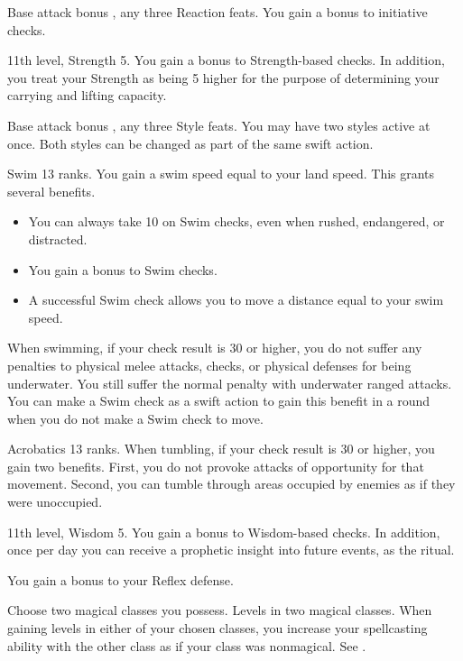 \featpre Base attack bonus , any three Reaction feats.
\featben You gain a  bonus to initiative checks.

\featpre 11th level, Strength 5.
\featben You gain a  bonus to Strength-based checks. In addition, you treat your Strength as being 5 higher for the purpose of determining your carrying and lifting capacity.

\featpre Base attack bonus , any three Style feats.
\featben You may have two styles active at once. Both styles can be changed as part of the same swift action.

\featpre Swim 13 ranks.
\featben You gain a swim speed equal to your land speed. This grants several benefits.
\begin{itemize}
  \item You can always take 10 on Swim checks, even when rushed, endangered, or distracted.
  \item You gain a  bonus to Swim checks.
  \item A successful Swim check allows you to move a distance equal to your swim speed.
\end{itemize}

When swimming, if your check result is 30 or higher, you do not suffer any penalties to physical melee attacks, checks, or physical defenses for being underwater. You still suffer the normal penalty with underwater ranged attacks. You can make a Swim check as a swift action to gain this benefit in a round when you do not make a Swim check to move.

\featpre Acrobatics 13 ranks.
\featben When tumbling, if your check result is 30 or higher, you gain two benefits. First, you do not provoke attacks of opportunity for that movement. Second, you can tumble through areas occupied by enemies as if they were unoccupied.

\featpre 11th level, Wisdom 5.
\featben You gain a  bonus to Wisdom-based checks. In addition, once per day you can receive a prophetic insight into future events, as the  ritual.

 You gain a  bonus to your Reflex defense.

Choose two magical classes you possess.
 Levels in two magical classes.
 When gaining levels in either of your chosen classes, you increase your spellcasting ability with the other class as if your class was nonmagical. See .

